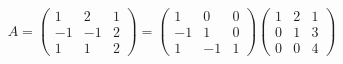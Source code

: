 \documentclass[a4paper]{article}
\begin{document}
\begin{snippetexample}{}
    \[
        A =
        \begin{pmatrix}
            1 & 2 & 1 \\ -1 & -1 & 2 \\ 1 & 1 & 2
        \end{pmatrix}
        =
        \begin{pmatrix}
            1 & 0 & 0 \\ -1 & 1 & 0 \\ 1 & -1 & 1
        \end{pmatrix}
        \begin{pmatrix}
            1 & 2 & 1 \\ 0 & 1 & 3 \\ 0 & 0 & 4
        \end{pmatrix}
    \]
\end{snippetexample}
\end{document}
